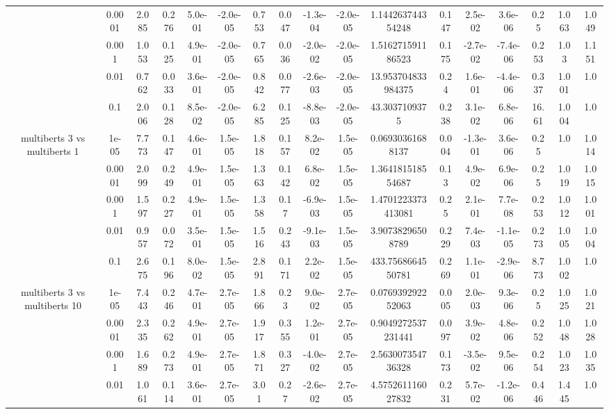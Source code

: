 \begin{tabular}{|c|c|c|c|c|c|c|c|c|c|c|c|c|c|c|c|c|}
 & 0.0001 & 2.085 & 0.276 & 5.0e-01 & -2.0e-05 & 0.753 & 0.047 & -1.3e-04 & -2.0e-05 & 1.144263744354248 & 0.147 & 2.5e-02 & 3.6e-06 & 0.25 & 1.063 & 1.049 \\
 & 0.001 & 1.053 & 0.125 & 4.9e-01 & -2.0e-05 & 0.765 & 0.036 & -2.0e-02 & -2.0e-05 & 1.516271591186523 & 0.175 & -2.7e-02 & -7.4e-06 & 0.253 & 1.03 & 1.151 \\
 & 0.01 & 0.762 & 0.033 & 3.6e-01 & -2.0e-05 & 0.842 & 0.077 & -2.6e-03 & -2.0e-05 & 13.953704833984375 & 0.24 & 1.6e-01 & -4.4e-06 & 0.337 & 1.001 & 1.0 \\
 & 0.1 & 2.006 & 0.128 & 8.5e-02 & -2.0e-05 & 6.285 & 0.125 & -8.8e-03 & -2.0e-05 & 43.3037109375 & 0.238 & 3.1e-02 & 6.8e-06 & 16.61 & 1.004 & 1.0 \\
\hline
\multirow{5}{*}{multiberts 3 vs multiberts 1} & 1e-05 & 7.773 & 0.147 & 4.6e-01 & 1.5e-05 & 1.818 & 0.157 & 8.2e-02 & 1.5e-05 & 0.06930361688137 & 0.004 & -1.3e-01 & 3.6e-06 & 0.25 & 1.0 & 1.014 \\
 & 0.0001 & 2.099 & 0.249 & 4.9e-01 & 1.5e-05 & 1.363 & 0.142 & 6.8e-02 & 1.5e-05 & 1.364181518554687 & 0.13 & 4.9e-02 & 6.9e-06 & 0.25 & 1.019 & 1.015 \\
 & 0.001 & 1.597 & 0.227 & 4.9e-01 & 1.5e-05 & 1.358 & 0.17 & -6.9e-03 & 1.5e-05 & 1.4701223373413081 & 0.25 & 2.1e-01 & 7.7e-08 & 0.253 & 1.012 & 1.001 \\
 & 0.01 & 0.957 & 0.072 & 3.5e-01 & 1.5e-05 & 1.516 & 0.243 & -9.1e-03 & 1.5e-05 & 3.90738296508789 & 0.229 & 7.4e-03 & -1.1e-05 & 0.273 & 1.005 & 1.004 \\
 & 0.1 & 2.675 & 0.196 & 8.0e-02 & 1.5e-05 & 2.891 & 0.171 & 2.2e-02 & 1.5e-05 & 433.7568664550781 & 0.269 & 1.1e-01 & -2.9e-06 & 8.773 & 1.002 & 1.0 \\
\hline
\multirow{5}{*}{multiberts 3 vs multiberts 10} & 1e-05 & 7.443 & 0.246 & 4.7e-01 & 2.7e-05 & 1.866 & 0.23 & 9.0e-02 & 2.7e-05 & 0.076939292252063 & 0.005 & 2.0e-03 & 9.3e-06 & 0.25 & 1.025 & 1.021 \\
 & 0.0001 & 2.335 & 0.262 & 4.9e-01 & 2.7e-05 & 1.917 & 0.355 & 1.2e-01 & 2.7e-05 & 0.9049272537231441 & 0.097 & 3.9e-02 & 4.8e-06 & 0.252 & 1.048 & 1.028 \\
 & 0.001 & 1.689 & 0.273 & 4.9e-01 & 2.7e-05 & 1.871 & 0.327 & -4.0e-02 & 2.7e-05 & 2.563007354736328 & 0.173 & -3.5e-02 & 9.5e-06 & 0.254 & 1.023 & 1.035 \\
 & 0.01 & 1.061 & 0.114 & 3.6e-01 & 2.7e-05 & 3.01 & 0.27 & -2.6e-02 & 2.7e-05 & 4.575261116027832 & 0.231 & 5.7e-02 & -1.2e-06 & 0.446 & 1.445 & 1.0 \\

\end{tabular}
